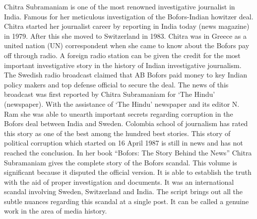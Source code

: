 \begin{multicols}{2}
\noi
Chitra Subramaniam is one of the most renowned investigative journalist in India. Famous for
her meticulous investigation of the Bofors-Indian howitzer deal. Chitra started her journalist
career by reporting in India today (news magazine) in 1979. After this she moved to
Switzerland in 1983. Chitra was in Greece as a united nation (UN) correspondent when she
came to know about the Bofors pay off through radio. A foreign radio station can be given the
credit for the most important investigative story in the history of Indian investigative
journalism. The Swedish radio broadcast claimed that AB Bofors paid money to key Indian
policy makers and top defense official to secure the deal. The news of this broadcast was first
reported by Chitra Subramaniam for ‘The Hindu’ (newspaper). With the assistance of ‘The
Hindu’ newspaper and its editor N. Ram she was able to unearth important secrets regarding
corruption in the Bofors deal between India and Sweden. Colombia school of journalism has
rated this story as one of the best among the hundred best stories. This story of political
corruption which started on 16 April 1987 is still in news and has not reached the conclusion.
In her book “Bofors: The Story Behind the News” Chitra Subramaniam gives the complete
story of the Bofors scandal. This volume is significant because it disputed the official version.
It is able to establish the truth with the aid of proper investigation and documents. It was an international scandal involving Sweden, Switzerland and India. The script brings out all the
subtle nuances regarding this scandal at a single post. It can be called a genuine work in the
area of media history.

\vspace{-.15cm}


\end{multicols}
